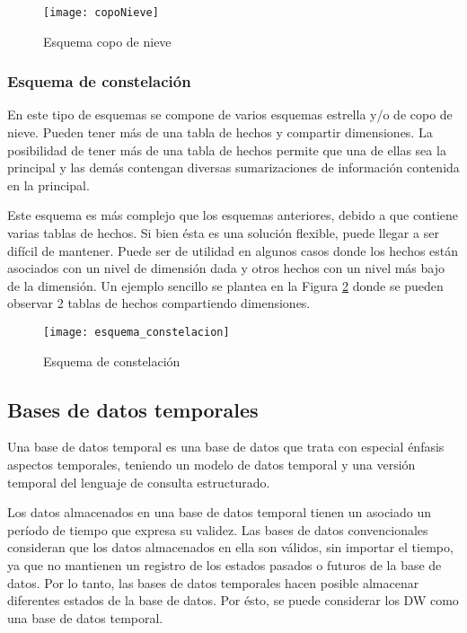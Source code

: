 \documentclass[a4paper,11pt]{article}
\begin{document}
    \begin{figure}
      \begin{center}
        \texttt{[image: copoNieve]}
        \caption{Esquema copo de nieve} \cite{dim_models}
        \label{snow_flk_sch}
      \end{center}
    \end{figure}
    
    
    \subsubsection{Esquema de constelación}
    
    En este tipo de esquemas se compone de varios esquemas estrella y/o de copo de nieve. Pueden tener más de una tabla de hechos y compartir dimensiones.
    La posibilidad de tener más de una tabla de hechos permite que una de ellas sea la principal y las demás contengan diversas sumarizaciones de información
    contenida en la principal.\par
    
    Este esquema es más complejo que los esquemas anteriores, debido a que contiene varias tablas de hechos. Si bien ésta es una solución flexible, puede 
    llegar a ser difícil de mantener. Puede ser de utilidad en algunos casos donde los hechos están asociados con un nivel de dimensión dada y otros hechos 
    con un nivel más bajo de la dimensión. Un ejemplo sencillo se plantea en la Figura \ref{const_sch} donde se pueden observar 2 tablas de hechos 
    compartiendo dimensiones.
    
    \begin{figure}
      \begin{center}
        \texttt{[image: esquema\_constelacion]}
        \caption{Esquema de constelación} \cite{dim_models}
        \label{const_sch}
      \end{center}
    \end{figure}
    
    
    \subsection{Bases de datos temporales}
    
    Una base de datos temporal es una base de datos que trata con especial énfasis aspectos temporales, teniendo un modelo de datos temporal y una versión
    temporal del lenguaje de consulta estructurado.\par
    Los datos almacenados en una base de datos temporal tienen un asociado un período de tiempo que expresa su validez. Las bases de datos convencionales
    consideran que los datos almacenados en ella son válidos, sin importar el tiempo, ya que no mantienen un registro de los estados pasados o futuros de
    la base de datos. Por lo tanto, las bases de datos temporales hacen posible almacenar diferentes estados de la base de datos. Por ésto, se puede 
    considerar los DW como una base de datos temporal.
    
\end{document}
